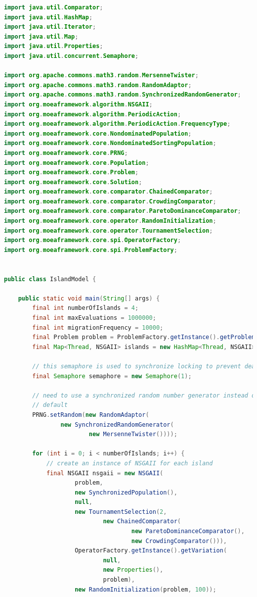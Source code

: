 {\begin{lstlisting}[language=Java]
import java.util.Comparator;
import java.util.HashMap;
import java.util.Iterator;
import java.util.Map;
import java.util.Properties;
import java.util.concurrent.Semaphore;

import org.apache.commons.math3.random.MersenneTwister;
import org.apache.commons.math3.random.RandomAdaptor;
import org.apache.commons.math3.random.SynchronizedRandomGenerator;
import org.moeaframework.algorithm.NSGAII;
import org.moeaframework.algorithm.PeriodicAction;
import org.moeaframework.algorithm.PeriodicAction.FrequencyType;
import org.moeaframework.core.NondominatedPopulation;
import org.moeaframework.core.NondominatedSortingPopulation;
import org.moeaframework.core.PRNG;
import org.moeaframework.core.Population;
import org.moeaframework.core.Problem;
import org.moeaframework.core.Solution;
import org.moeaframework.core.comparator.ChainedComparator;
import org.moeaframework.core.comparator.CrowdingComparator;
import org.moeaframework.core.comparator.ParetoDominanceComparator;
import org.moeaframework.core.operator.RandomInitialization;
import org.moeaframework.core.operator.TournamentSelection;
import org.moeaframework.core.spi.OperatorFactory;
import org.moeaframework.core.spi.ProblemFactory;


public class IslandModel {
	
	public static void main(String[] args) {
		final int numberOfIslands = 4;
		final int maxEvaluations = 1000000;
		final int migrationFrequency = 10000;
		final Problem problem = ProblemFactory.getInstance().getProblem("DTLZ2_2");
		final Map<Thread, NSGAII> islands = new HashMap<Thread, NSGAII>();
		
		// this semaphore is used to synchronize locking to prevent deadlocks
		final Semaphore semaphore = new Semaphore(1);
		
		// need to use a synchronized random number generator instead of the
		// default
		PRNG.setRandom(new RandomAdaptor(
				new SynchronizedRandomGenerator(
						new MersenneTwister())));
		
		for (int i = 0; i < numberOfIslands; i++) {
			// create an instance of NSGAII for each island
			final NSGAII nsgaii = new NSGAII(
					problem,
					new SynchronizedPopulation(),
					null,
					new TournamentSelection(2, 
							new ChainedComparator(
									new ParetoDominanceComparator(),
									new CrowdingComparator())),
					OperatorFactory.getInstance().getVariation(
							null,
							new Properties(),
							problem),
					new RandomInitialization(problem, 100));
			

\end{lstlisting}}

